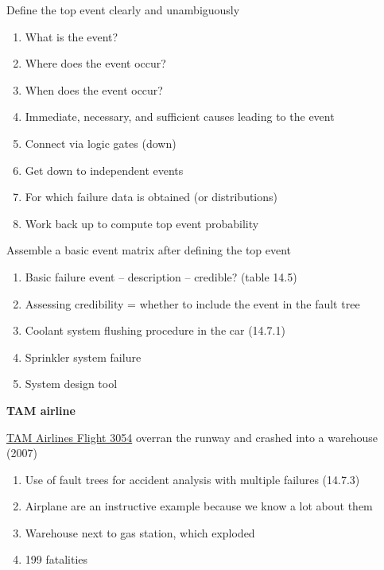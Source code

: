 \documentclass[aspectratio=1610,pdftex,dvipsnames,compress,xcolor={dvipsnames}]{beamer}
\begin{document}
\begin{frame}{Define the top event clearly and unambiguously}
    \begin{enumerate}[series=outerlist,topsep=0pt,itemsep=7pt,leftmargin=*,label=(\arabic*)]
        \item[]What is the event?  
        \item[]Where does the event occur?  
        \item[]When does the event occur?
        \item[]Immediate, necessary, and sufficient causes leading to the event
        \item[]Connect via logic gates (down)
        \item[]Get down to independent events  
        \item[]For which failure data is obtained (or distributions)  
        \item[]Work back up to compute top event probability
    \end{enumerate}
\end{frame}


\begin{frame}{Assemble a basic event matrix after defining the top event}
    \begin{enumerate}[series=outerlist,topsep=0pt,itemsep=21pt,leftmargin=*,label=(\arabic*)]
        \item[]Basic failure event -- description -- credible? (table 14.5)
        \item[]Assessing credibility = whether to include the event in the fault tree
        \item[]Coolant system flushing procedure in the car (14.7.1)
        \item[]Sprinkler system failure
        \item[]System design tool
    \end{enumerate}
\end{frame}


\begin{frame}[plain]{}
    \centering\LARGE\textbf{TAM airline}
\end{frame}


\addtocounter{framenumber}{-1}
\begin{frame}{\href{https://maps.app.goo.gl/nUTrfB5vhgz1zwSUA}{TAM Airlines Flight 3054} overran the runway and crashed into a warehouse (2007)}
    \begin{enumerate}[series=outerlist,topsep=0pt,itemsep=21pt,leftmargin=*,label=(\arabic*)]
        \item[]Use of fault trees for accident analysis with multiple failures (14.7.3)
        \item[]Airplane are an instructive example because we know a lot about them
        \item[]Warehouse next to gas station, which exploded
        \item[]199 fatalities
    \end{enumerate}
\end{frame}
\end{document}
